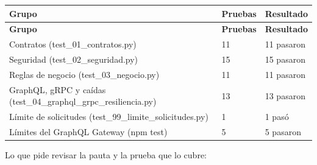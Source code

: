 \documentclass[10pt,letterpaper]{article}
\begin{document}
{\footnotesize
\begin{longtable}{|P{\tabcolsep\relax}|P{\tabcolsep\relax}|P{\tabcolsep\relax}|}
\hline
\textbf{Grupo} & \textbf{Pruebas} & \textbf{Resultado} \\ \hline
\endfirsthead
\hline
\textbf{Grupo} & \textbf{Pruebas} & \textbf{Resultado} \\ \hline
\endhead
Contratos (test\_\allowbreak{}01\_\allowbreak{}contratos.\allowbreak{}py) & 11 & 11 pasaron \\ \hline
Seguridad (test\_\allowbreak{}02\_\allowbreak{}seguridad.\allowbreak{}py) & 15 & 15 pasaron \\ \hline
Reglas de negocio (test\_\allowbreak{}03\_\allowbreak{}negocio.\allowbreak{}py) & 11 & 11 pasaron \\ \hline
GraphQL, gRPC y caídas (test\_\allowbreak{}04\_\allowbreak{}graphql\_\allowbreak{}grpc\_\allowbreak{}resiliencia.\allowbreak{}py) & 13 & 13 pasaron \\ \hline
Límite de solicitudes (test\_\allowbreak{}99\_\allowbreak{}limite\_\allowbreak{}solicitudes.\allowbreak{}py) & 1 & 1 pasó \\ \hline
Límites del GraphQL Gateway (npm test) & 5 & 5 pasaron \\ \hline
\end{longtable}}
Lo que pide revisar la pauta y la prueba que lo cubre:
\end{document}
